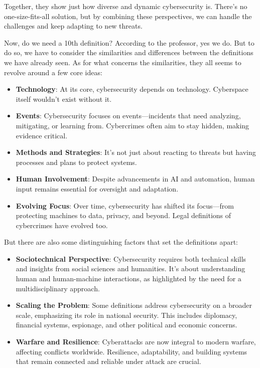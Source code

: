 Together, they show just how diverse and dynamic cybersecurity is.
There’s no one-size-fits-all solution, but by combining these
perspectives, we can handle the challenges and keep adapting to new
threats.

Now, do we need a 10th definition? According to the professor, yes we
do. But to do so, we have to consider the similarities and differences 
between the definitions we have already seen. 
As for what concerns the similarities, they all seems to revolve
around a few core ideas:
\begin{itemize}
    \item \textbf{Technology}: At its core, cybersecurity depends on
      technology. Cyberspace itself wouldn’t exist without it.
    \item \textbf{Events}: Cybersecurity focuses on events—incidents
      that need analyzing, mitigating, or learning from. Cybercrimes
      often aim to stay hidden, making evidence critical.
    \item \textbf{Methods and Strategies}: It’s not just about
      reacting to threats but having processes and plans to protect
      systems.
    \item \textbf{Human Involvement}: Despite advancements in AI and
      automation, human input remains essential for oversight and
      adaptation.
    \item \textbf{Evolving Focus}: Over time, cybersecurity has
      shifted its focus—from protecting machines to data, privacy, and
      beyond. Legal definitions of cybercrimes have evolved too.
\end{itemize}


But there are also some distinguishing factors that set the 
definitions apart:
\begin{itemize}
    \item \textbf{Sociotechnical Perspective}: Cybersecurity requires
      both technical skills and insights from social sciences and
      humanities. It’s about understanding human and human-machine
      interactions, as highlighted by the need for a multidisciplinary
      approach.
    \item \textbf{Scaling the Problem}: Some definitions address
      cybersecurity on a broader scale, emphasizing its role in
      national security. This includes diplomacy, financial systems,
      espionage, and other political and economic concerns.
    \item \textbf{Warfare and Resilience}: Cyberattacks are now
      integral to modern warfare, affecting conflicts worldwide.
      Resilience, adaptability, and building systems that remain
      connected and reliable under attack are crucial.
\end{itemize}

